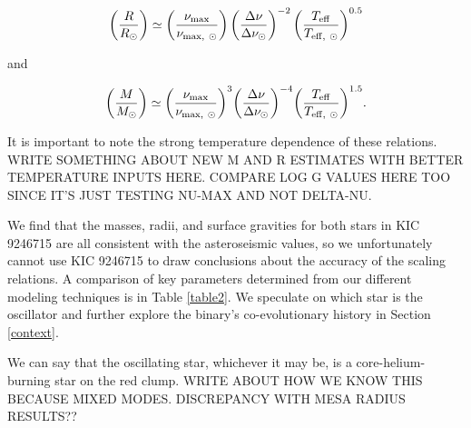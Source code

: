 \begin{equation} \label{radeq}
\left( \frac{R}{R_\odot} \right) \simeq \left( \frac{\nu_{\rm{max}}}{\nu_{\rm{max, \ \odot}}} \right) \left( \frac{\Delta \nu}{\Delta \nu_\odot} \right)^{-2} {\left( \frac{T_{\rm{eff}}}{T_{\rm{eff, \ \odot}}} \right)}^{0.5}
\end{equation}

and

\begin{equation} \label{masseq}
{\left( \frac{M}{M_\odot} \right)} \simeq {\left( \frac{\nu_{\rm{max}}}{\nu_{\rm{max, \ \odot}}} \right)}^{3} {\left( \frac{\Delta \nu}{\Delta \nu_\odot} \right)}^{-4} {\left( \frac {T_{\rm{eff}}} {T_{\rm{eff, \ \odot}}} \right)}^{1.5}.
\end{equation}

It is important to note the strong temperature dependence of these relations. WRITE SOMETHING ABOUT NEW M AND R ESTIMATES WITH BETTER TEMPERATURE INPUTS HERE. COMPARE LOG G VALUES HERE TOO SINCE IT'S JUST TESTING NU-MAX AND NOT DELTA-NU.

We find that the masses, radii, and surface gravities for both stars in KIC 9246715 are all consistent with the asteroseismic values, so we unfortunately cannot use KIC 9246715 to draw conclusions about the accuracy of the scaling relations. A comparison of key parameters determined from our different modeling techniques is in Table \ref{table2}. We speculate on which star is the oscillator and further explore the binary's co-evolutionary history in Section \ref{context}.

We can say that the oscillating star, whichever it may be, is a core-helium-burning star on the red clump. WRITE ABOUT HOW WE KNOW THIS BECAUSE MIXED MODES. DISCREPANCY WITH MESA RADIUS RESULTS??

  
  
  
  
  
  
  
